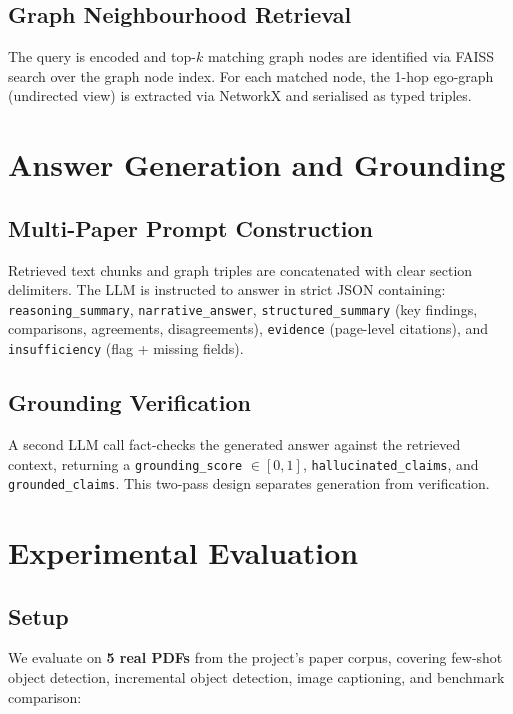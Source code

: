 \documentclass[conference]{IEEEtran}
\begin{document}
\subsection{Graph Neighbourhood Retrieval}
The query is encoded and top-$k$ matching graph nodes are identified
via FAISS search over the graph node index. For each matched node, the
1-hop ego-graph (undirected view) is extracted via NetworkX and
serialised as typed triples.

\section{Answer Generation and Grounding}
\label{sec:generation}

\subsection{Multi-Paper Prompt Construction}
Retrieved text chunks and graph triples are concatenated with clear
section delimiters. The LLM is instructed to answer in strict JSON
containing: \texttt{reasoning\_summary}, \texttt{narrative\_answer},
\texttt{structured\_summary} (key findings, comparisons, agreements,
disagreements), \texttt{evidence} (page-level citations), and
\texttt{insufficiency} (flag + missing fields).

\subsection{Grounding Verification}
A second LLM call fact-checks the generated answer against the
retrieved context, returning a \texttt{grounding\_score} $\in [0, 1]$,
\texttt{hallucinated\_claims}, and \texttt{grounded\_claims}. This
two-pass design separates generation from verification.

\section{Experimental Evaluation}
\label{sec:experiments}

\subsection{Setup}
\label{sec:setup}

We evaluate on \textbf{5 real PDFs} from the project's paper corpus,
covering few-shot object detection, incremental object detection, image
captioning, and benchmark comparison:
\end{document}
